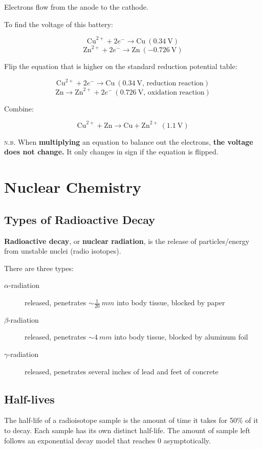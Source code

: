 \documentclass[a4paper, 12pt]{article}
\begin{document}
Electrons flow from the anode to the cathode.

To find the voltage of this battery:

$$\text{Cu}^{2+} + 2e^- \longrightarrow \text{Cu} \: (0.34 \: \text{V})$$
$$\text{Zn}^{2+} + 2e^- \longrightarrow \text{Zn} \: (-0.726 \: \text{V})$$

Flip the equation that is higher on the standard reduction potential table:

$$\text{Cu}^{2+} + 2e^- \longrightarrow \text{Cu} \: (0.34 \: \text{V, reduction reaction})$$
$$\text{Zn} \longrightarrow \text{Zn}^{2+} + 2e^- \: (0.726 \: \text{V, oxidation reaction})$$

Combine:

$$\text{Cu}^{2+} + \text{Zn} \longrightarrow \text{Cu} + \text{Zn}^{2+} \: \boxed{(1.1 \: \text{V})}$$

\textsc{n.b.} When \textbf{multiplying} an equation to balance out the electrons, \textbf{the voltage does not change.} It only changes in sign if the equation is flipped.

\section{Nuclear Chemistry}

\subsection{Types of Radioactive Decay}
\textbf{Radioactive decay}, or \textbf{nuclear radiation}, is the release of particles/energy from unstable nuclei (radio isotopes).

There are three types:

\begin{description}
\item [$\alpha$-radiation]  released, penetrates $\sim \frac{1}{20} \: mm$ into body tissue, blocked by paper
\item [$\beta$-radiation]  released, penetrates $\sim 4 \: mm$ into body tissue, blocked by aluminum foil
\item [$\gamma$-radiation]  released, penetrates several inches of lead and feet of concrete
\end{description}

\subsection{Half-lives}
The half-life of a radioisotope sample is the amount of time it takes for 50\% of it to decay. Each sample has its own distinct half-life. The amount of sample left follows an exponential decay model that reaches 0 asymptotically.
\end{document}
